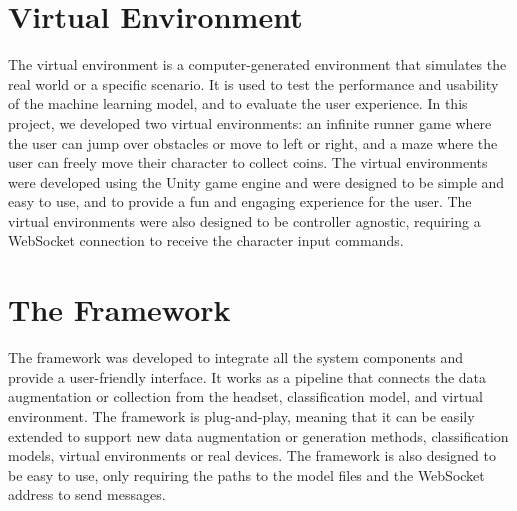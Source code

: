 \section{Virtual Environment}
The virtual environment is a computer-generated environment that simulates the real world or a specific scenario.
It is used to test the performance and usability of the machine learning model, and to evaluate the user experience.
In this project, we developed two virtual environments: an infinite runner game where the user can jump over obstacles or move to left or right, and a maze where the user can freely move their character to collect coins.
The virtual environments were developed using the Unity game engine and were designed to be simple and easy to use, and to provide a fun and engaging experience for the user.
The virtual environments were also designed to be controller agnostic, requiring a WebSocket connection to receive the character input commands.

\section{The Framework}
The framework was developed to integrate all the system components and provide a user-friendly interface.
It works as a pipeline that connects the data augmentation or collection from the headset, classification model, and virtual environment.
The framework is plug-and-play, meaning that it can be easily extended to support new data augmentation or generation methods, classification models, virtual environments or real devices.
The framework is also designed to be easy to use, only requiring the paths to the model files and the WebSocket address to send messages.

